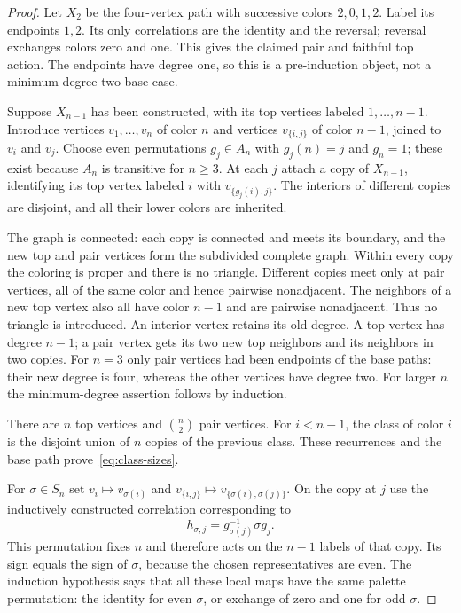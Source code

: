 \begin{proof}
Let $X_2$ be the four-vertex path with successive colors $2,0,1,2$.
Label its endpoints $1,2$. Its only correlations are the identity and the
reversal; reversal exchanges colors zero and one. This gives the claimed
pair and faithful top action. The endpoints have degree one, so this is a
pre-induction object, not a minimum-degree-two base case.

Suppose $X_{n-1}$ has been constructed, with its top vertices labeled
$1,\ldots,n-1$. Introduce vertices $v_1,\ldots,v_n$ of color $n$ and
vertices $v_{\{i,j\}}$ of color $n-1$, joined to $v_i$ and $v_j$.
Choose even permutations $g_j\in A_n$ with $g_j(n)=j$ and $g_n=1$;
these exist because $A_n$ is transitive for $n\geq3$.
At each $j$ attach a copy of $X_{n-1}$, identifying its top vertex labeled
$i$ with $v_{\{g_j(i),j\}}$. The interiors of different copies are disjoint,
and all their lower colors are inherited.

The graph is connected: each copy is connected and meets its boundary, and
the new top and pair vertices form the subdivided complete graph.
Within every copy the coloring is proper and there is no triangle.
Different copies meet only at pair vertices, all of the same color and hence
pairwise nonadjacent. The neighbors of a new top vertex also all have color
$n-1$ and are pairwise nonadjacent. Thus no triangle is introduced.
An interior vertex retains its old degree. A top vertex has degree $n-1$;
a pair vertex gets its two new top neighbors and its neighbors in two copies.
For $n=3$ only pair vertices had been endpoints of the base paths: their
new degree is four, whereas the other vertices have degree two.
For larger $n$ the minimum-degree assertion follows by induction.

There are $n$ top vertices and $\binom n2$ pair vertices. For $i<n-1$,
the class of color $i$ is the disjoint union of $n$ copies of the previous
class. These recurrences and the base path prove~\eqref{eq:class-sizes}.

For $\sigma\in S_n$ set $v_i\mapsto v_{\sigma(i)}$ and
$v_{\{i,j\}}\mapsto v_{\{\sigma(i),\sigma(j)\}}$. On the copy at $j$
use the inductively constructed correlation corresponding to
\[
 h_{\sigma,j}=g_{\sigma(j)}^{-1}\sigma g_j.
\]
This permutation fixes $n$ and therefore acts on the $n-1$ labels of that
copy. Its sign equals the sign of $\sigma$, because the chosen representatives
are even. The induction hypothesis says that all these local maps have the
same palette permutation: the identity for even $\sigma$, or exchange of
zero and one for odd $\sigma$.


\end{proof}
